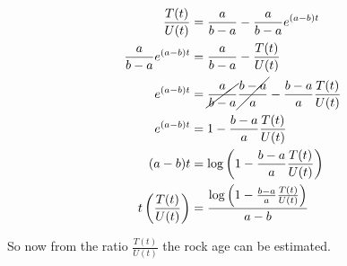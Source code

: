   \begin{align*}
    \frac{T(t)}{U(t)} &= \frac{a}{b-a} - \frac{a}{b-a}e^{(a-b)t}\\
    \frac{a}{b-a}e^{(a-b)t} &= \frac{a}{b-a} - \frac{T(t)}{U(t)}  \\
    e^{(a-b)t} &= \cancel{\frac{a}{b-a}}\cancel{\frac{b-a}{a}} - \frac{b-a}{a}\frac{T(t)}{U(t)}  \\
    e^{(a-b)t} &= 1 - \frac{b-a}{a}\frac{T(t)}{U(t)}\\
    (a-b)t &= \log\left(1 - \frac{b-a}{a}\frac{T(t)}{U(t)}\right)\\
    t\left(\frac{T(t)}{U(t)}\right) &= \frac{\log\left(1 - \frac{b-a}{a}\frac{T(t)}{U(t)}\right)}{a-b}
  \end{align*}

  So now from the ratio $\frac{T(t)}{U(t)}$ the rock age can be estimated.

